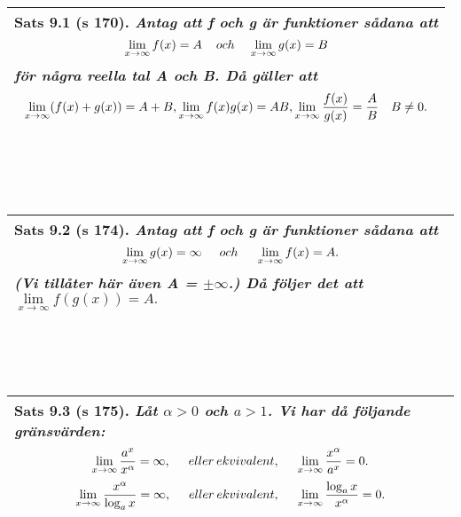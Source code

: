 \documentclass[a4paper]{article}
\begin{document}
\\\\\\
\begin{tabular}{|L{11.5cm}|} \hline
\textbf{Sats 9.1} (s 170).
\textit{Antag att f och g är funktioner sådana att}
\begin{displaymath}
\lim_{x\rightarrow\infty} f(x)=A \hspace{0.4cm} och \hspace{0.4cm} \lim_{x\rightarrow\infty} g(x)=B
\end{displaymath}
\textit{för några reella tal A och B. Då gäller att}
\begin{equation*}
\begin{array}{>{\displaystyle}c}
\lim_{x\rightarrow\infty} (f(x)+g(x)) =A+B,
\lim_{x\rightarrow\infty}  f(x)g(x) =AB,
\lim_{x\rightarrow\infty}   \frac{f(x)}{g(x)} = \frac{A}{B} \hspace{0.3cm} \hspace{1.5pt} B \neq 0.
\end{array}
\end{equation*}
\\\hline
\end{tabular}
\\\\\\
\begin{tabular}{|L{11.5cm}|} \hline
\textbf{Sats 9.2} (s 174).
\textit{Antag att f och g är funktioner sådana att}
\begin{displaymath}
\lim_{x \rightarrow \infty} g(x) = \infty \hspace{0.5cm} och \hspace{0.5cm} \lim_{x\rightarrow\infty} f(x) = A.
\end{displaymath}
\textit{(Vi tillåter här även A = $\pm \infty$.) Då följer det att} $\lim\limits_{x\rightarrow\infty} f(g(x)) = A.$
\vspace{0.2cm}
\\\hline
\end{tabular}
\\\\\\
\begin{tabular}{|L{11.5cm}|} \hline
\textbf{Sats 9.3} (s 175).
\textit{Låt $\alpha > 0$ och $a > 1$. Vi har då följande gränsvärden:}
\begin{displaymath}
\lim_{x \rightarrow \infty} \frac{a^x}{x^\alpha} = \infty, \hspace{0.5cm} eller \hspace{2pt} ekvivalent, \hspace{0.5cm} \lim_{x \rightarrow \infty}\frac{x^\alpha}{a^x} = 0.
\end{displaymath}
\begin{displaymath}
\lim_{x \rightarrow \infty} \frac{x^\alpha}{\log_ax} = \infty, \hspace{0.5cm} eller \hspace{2pt} ekvivalent, \hspace{0.5cm} \lim_{x \rightarrow \infty}\frac{\log_ax}{x^\alpha} = 0.
\end{displaymath}
\\\hline
\end{tabular}
\end{document}
